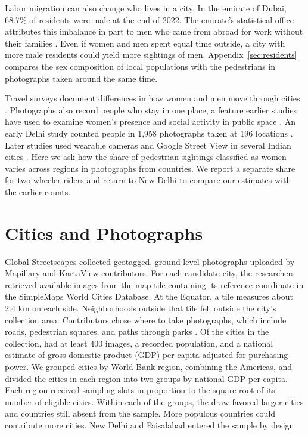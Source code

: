 \documentclass[11pt]{article}
\begin{document}
Labor migration can also change who lives in a city. In the emirate of Dubai, 68.7\% of residents were male at the end of 2022. The emirate’s statistical office attributes this imbalance in part to men who came from abroad for work without their families \citep[Table~1 and Section~2]{dubai2022population}. Even if women and men spent equal time outside, a city with more male residents could yield more sightings of men. Appendix~\ref{sec:residents} compares the sex composition of local populations with the pedestrians in photographs taken around the same time.

Travel surveys document differences in how women and men move through cities \citep{goel2022mobility,goel2023gendergap}. Photographs also record people who stay in one place, a feature earlier studies have used to examine women’s presence and social activity in public space \citep{turku2021walking,elrod2025sociability}. An early Delhi study counted people in 1,958 photographs taken at 196 locations \citep{sood2017womencount}. Later studies used wearable cameras and Google Street View in several Indian cities \citep{karekurve2026streetscope,sood2026streetsight}. Here we ask how the share of pedestrian sightings classified as women varies across regions in photographs from \TotalCountries{} countries. We report a separate share for two-wheeler riders and return to New Delhi to compare our estimates with the earlier counts.

\section{Cities and Photographs}
Global Streetscapes collected geotagged, ground-level photographs uploaded by Mapillary and KartaView contributors. For each candidate city, the researchers retrieved available images from the map tile containing its reference coordinate in the SimpleMaps World Cities Database. At the Equator, a tile measures about 2.4 km on each side. Neighborhoods outside that tile fell outside the city’s collection area. Contributors chose where to take photographs, which include roads, pedestrian squares, and paths through parks \citep{hou2024globalstreetscapes}. Of the \CorpusCities{} cities in the collection, \EligibleCities{} had at least 400 images, a recorded population, and a national estimate of gross domestic product (GDP) per capita adjusted for purchasing power. We grouped cities by World Bank region, combining the Americas, and divided the cities in each region into two groups by national GDP per capita. Each region received sampling slots in proportion to the square root of its number of eligible cities. Within each of the \TotalStrata{} groups, the draw favored larger cities and countries still absent from the sample. More populous countries could contribute more cities. New Delhi and Faisalabad entered the sample by design.
\end{document}
